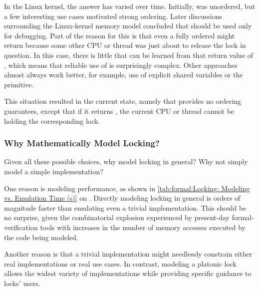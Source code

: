 In the Linux kernel, the answer has varied over time.
Initially,  was unordered, but a few interesting
use cases motivated strong ordering.
Later discussions surrounding the Linux-kernel memory model concluded
that  should be used only for debugging.
Part of the reason for this is that even a fully ordered
 might return  because some other CPU or
thread was just about to release the lock in question.
In this case, there is little that can be learned from that return value
of , which means that reliable use of 
is surprisingly complex.
Other approaches almost always work better, for example, use of explicit
shared variables or the  primitive.

This situation resulted in the current state, namely that
 provides no ordering guarantees, except that if
it returns , the current CPU or thread cannot be holding the
corresponding lock.

\QuickQuizEnd

\subsubsection{Why Mathematically Model Locking?}
\label{sec:memorder:Why Mathematically Model Locking?}

Given all these possible choices, why model locking in general?
Why not simply model a simple implementation?

One reason is modeling performance, as shown in
\cref{tab:formal:Locking: Modeling vs. Emulation Time (s)}
on
.
Directly modeling locking in general is orders of magnitude faster
than emulating even a trivial implementation.
This should be no surprise, given the combinatorial explosion experienced
by present-day formal-verification tools with increases in the number of
memory accesses executed by the code being modeled.

Another reason is that a trivial implementation might needlessly constrain
either real implementations or real use cases.
In contrast, modeling a platonic lock allows the widest variety of
implementations while providing specific guidance to locks' users.

